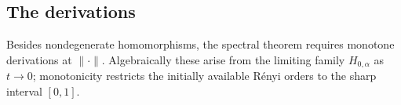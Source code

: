 \documentclass[aps,pra,11pt,onecolumn,nofootinbib,tightenlines]{revtex4-2}
\theoremstyle{definition}
\def \d {\mathrm{d}}
\newcommand{\cS}{\mathcal{S}}
\newcommand{\Y}{\mathcal{Y}}
\begin{document}




\subsection{The derivations}
\label{sec: derivations}
Besides nondegenerate homomorphisms, the spectral theorem requires monotone
derivations at $\|\cdot\|$. Algebraically these arise from the limiting family
$H_{0,\alpha}$ as $t\to0$; monotonicity restricts the initially available
Rényi orders to the sharp interval $[0,1]$.
\end{document}
